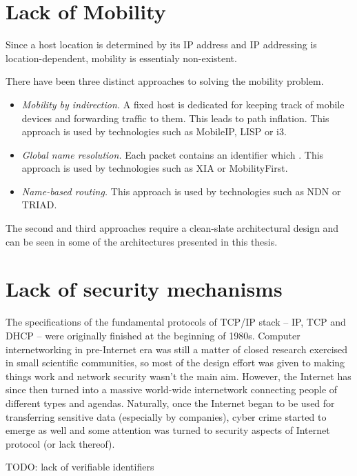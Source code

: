     \section{Lack of Mobility}

        Since a host location is determined by its IP address and IP addressing is location-dependent, mobility is essentialy non-existent.

        There have been three distinct approaches to solving the mobility problem.

        \begin{itemize}
            \item \emph{Mobility by indirection.} A fixed host is dedicated for keeping track of mobile devices and forwarding traffic to them. This leads to path inflation.
            This approach is used by technologies such as MobileIP, LISP or i3.
            \item \emph{Global name resolution.} Each packet contains an identifier which .
            This approach is used by technologies such as XIA or MobilityFirst.
            \item \emph{Name-based routing.}
            This approach is used by technologies such as NDN or TRIAD.
        \end{itemize}

        The second and third approaches require a clean-slate architectural design and can be seen in some of the architectures presented in this thesis.


    \section{Lack of security mechanisms}
        The specifications of the fundamental protocols of TCP/IP stack -- IP, TCP and DHCP -- were originally finished at the beginning of 1980s. Computer internetworking in pre-Internet era was still a matter of closed research exercised in small scientific communities, so most of the design effort was given to making things work and network security wasn't the main aim. However, the Internet has since then turned into a massive world-wide internetwork connecting people of different types and agendas. Naturally, once the Internet began to be used for transferring sensitive data (especially by companies), cyber crime started to emerge as well and some attention was turned to security aspects of Internet protocol (or lack thereof).

        TODO: lack of verifiable identifiers

